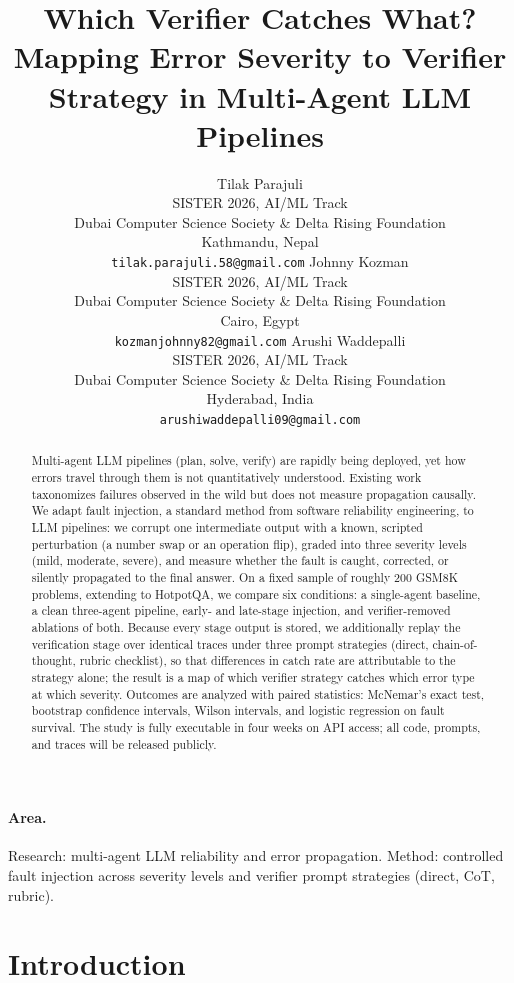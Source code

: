 \documentclass{article}
\title{Which Verifier Catches What? Mapping Error Severity to Verifier Strategy in Multi-Agent LLM Pipelines}
\author{%
  Tilak Parajuli\\
  SISTER 2026, AI/ML Track\\
  Dubai Computer Science Society \& Delta Rising Foundation\\
  Kathmandu, Nepal\\
  \texttt{tilak.parajuli.58@gmail.com}
   \And
  Johnny Kozman\\
  SISTER 2026, AI/ML Track\\
  Dubai Computer Science Society \& Delta Rising Foundation\\
  Cairo, Egypt\\
  \texttt{kozmanjohnny82@gmail.com}
   \And
  Arushi Waddepalli\\
  SISTER 2026, AI/ML Track\\
  Dubai Computer Science Society \& Delta Rising Foundation\\
  Hyderabad, India\\
  \texttt{arushiwaddepalli09@gmail.com}
}
\begin{document}
\maketitle

\paragraph{Area.} Research: multi-agent LLM reliability and error propagation. Method: controlled fault injection across severity levels and verifier prompt strategies (direct, CoT, rubric).


\begin{abstract}
Multi-agent LLM pipelines (plan, solve, verify) are rapidly being deployed,
yet how errors travel through them is not quantitatively understood. Existing
work taxonomizes failures observed in the wild \citep{cemri2025mast} but does
not measure propagation causally. We adapt fault injection, a standard method
from software reliability engineering, to LLM pipelines: we corrupt one
intermediate output with a known, scripted perturbation (a number swap or an
operation flip), graded into three severity levels (mild, moderate, severe),
and measure whether the fault is caught, corrected, or silently propagated to
the final answer. On a fixed sample of roughly 200 GSM8K problems, extending
to HotpotQA, we compare six conditions: a single-agent baseline, a clean
three-agent pipeline, early- and late-stage injection, and verifier-removed
ablations of both. Because every stage output is stored, we additionally
replay the verification stage over identical traces under three prompt
strategies (direct, chain-of-thought, rubric checklist), so that differences
in catch rate are attributable to the strategy alone; the result is a map of
which verifier strategy catches which error type at which severity. Outcomes
are analyzed with paired statistics: McNemar's exact test, bootstrap
confidence intervals, Wilson intervals, and logistic regression on fault
survival. The study is fully executable in four weeks on API access; all
code, prompts, and traces will be released publicly.
\end{abstract}

\section{Introduction}
\end{document}
